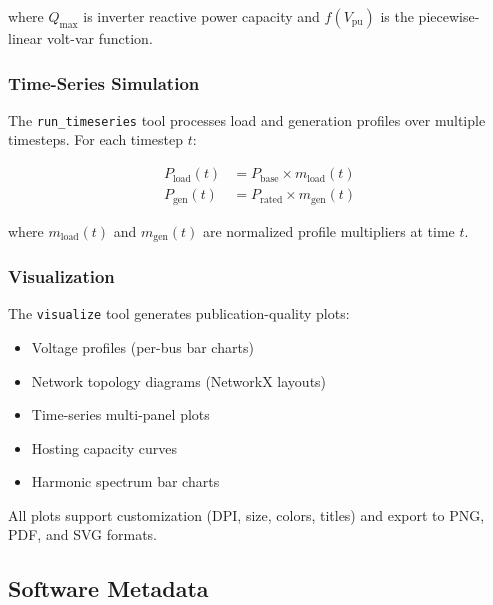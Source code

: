 \documentclass[review]{elsarticle}
\begin{document}
where $Q_{\text{max}}$ is inverter reactive power capacity and $f(V_{\text{pu}})$ is the piecewise-linear volt-var function.

\subsubsection{Time-Series Simulation}
The \texttt{run\_timeseries} tool processes load and generation profiles over multiple timesteps. For each timestep $t$:

\begin{align}
P_{\text{load}}(t) &= P_{\text{base}} \times m_{\text{load}}(t) \\
P_{\text{gen}}(t) &= P_{\text{rated}} \times m_{\text{gen}}(t)
\end{align}

where $m_{\text{load}}(t)$ and $m_{\text{gen}}(t)$ are normalized profile multipliers at time $t$.

\subsubsection{Visualization}
The \texttt{visualize} tool generates publication-quality plots:
\begin{itemize}
    \item Voltage profiles (per-bus bar charts)
    \item Network topology diagrams (NetworkX layouts)
    \item Time-series multi-panel plots
    \item Hosting capacity curves
    \item Harmonic spectrum bar charts
\end{itemize}

All plots support customization (DPI, size, colors, titles) and export to PNG, PDF, and SVG formats.

\subsection{Software Metadata}
\end{document}
